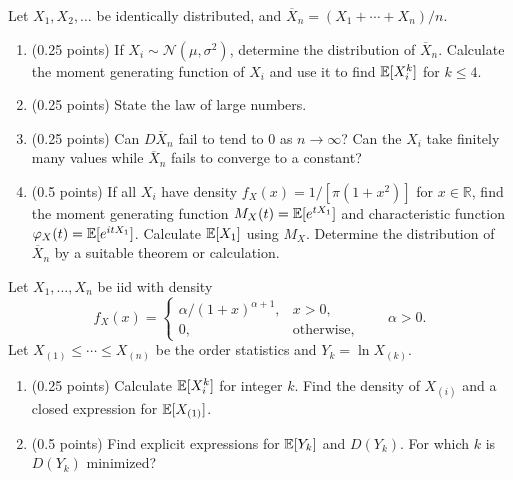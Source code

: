 \documentclass[a4paper]{report}
\begin{document}
\begin{problem}
Let $X_1,X_2,\ldots$ be identically distributed, and $\overline X_n=(X_1+\cdots+X_n)/n$.
\begin{enumerate}
\item (0.25 points) If $X_i\sim\mathcal N(\mu,\sigma^2)$, determine the distribution of $\overline X_n$. Calculate the moment generating function of $X_i$ and use it to find $\mathbb {E}[X_i^k]$ for $k\leq4$.
\item (0.25 points) State the law of large numbers.
\item (0.25 points) Can $D\overline X_n$ fail to tend to 0 as $n\to\infty$? Can the $X_i$ take finitely many values while $\overline X_n$ fails to converge to a constant?
\item (0.5 points) If all $X_i$ have density $f_X(x)=1/[\pi(1+x^2)]$ for $x\in\mathbb R$, find the moment generating function $M_X(t)=\mathbb {E}[e^{tX_1}]$ and characteristic function $\varphi_X(t)=\mathbb {E}[e^{itX_1}]$. Calculate $\mathbb {E}[X_1]$ using $M_X$. Determine the distribution of $\overline X_n$ by a suitable theorem or calculation.
\end{enumerate}
\end{problem}
\begin{problem}
Let $X_1,\ldots,X_n$ be iid with density
\[f_X(x)=\begin{cases}\alpha/(1+x)^{\alpha+1},&x>0,\\0,&\text{otherwise,}\end{cases}\qquad\alpha>0.\]
Let $X_{(1)}\leq\cdots\leq X_{(n)}$ be the order statistics and $Y_k=\ln X_{(k)}$.
\begin{enumerate}
\item (0.25 points) Calculate $\mathbb {E}[X_i^k]$ for integer $k$. Find the density of $X_{(i)}$ and a closed expression for $\mathbb {E}[X_{(1)}]$.
\item (0.5 points) Find explicit expressions for $\mathbb {E}[Y_k]$ and $D(Y_k)$. For which $k$ is $D(Y_k)$ minimized?
\end{enumerate}
\end{problem}
\end{document}
